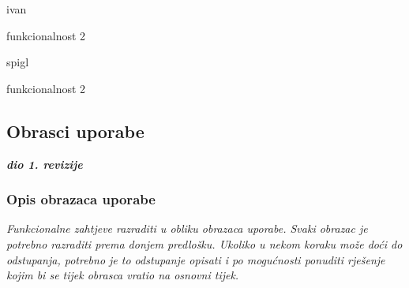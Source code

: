 \begin{packed_enum}
\begin{packed_enum}
					\item ivan
					\item funkcionalnost 2
					
				\end{packed_enum}
			
				\item  {}
				
				\begin{packed_enum}
					
					\item spigl
					\item funkcionalnost 2
					
				\end{packed_enum}
			
			\end{packed_enum}
			
			\eject 
			
			
				
			\subsection{Obrasci uporabe}
				
				\textbf{\textit{dio 1. revizije}}
				
				\subsubsection{Opis obrazaca uporabe}
					\textit{Funkcionalne zahtjeve razraditi u obliku obrazaca uporabe. Svaki obrazac je potrebno razraditi prema donjem predlošku. Ukoliko u nekom koraku može doći do odstupanja, potrebno je to odstupanje opisati i po mogućnosti ponuditi rješenje kojim bi se tijek obrasca vratio na osnovni tijek.}\\
					

